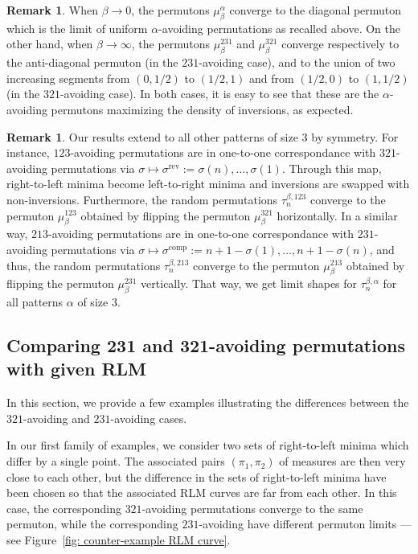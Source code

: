 \documentclass[a4paper,11pt]{amsart}
\theoremstyle{definition}
\newtheorem{rem}[thm]{Remark}
\begin{document}
\begin{rem}
When $\beta \to 0$, the permutons $\mu^{\alpha}_{\beta}$ converge to the diagonal permuton which is the limit of uniform $\alpha$-avoiding permutations as recalled above.
On the other hand, when $\beta \to \infty$, 
the permutons $\mu^{231}_{\beta}$ and $\mu^{321}_{\beta}$ converge respectively to the anti-diagonal permuton (in the $231$-avoiding case), 
and to the union of two increasing segments from $(0,1/2)$ to $(1/2,1)$ and from $(1/2,0)$ to $(1,1/2)$ (in the $321$-avoiding case). 
In both cases, it is easy to see that these are the $\alpha$-avoiding permutons maximizing the density of inversions, as expected.
\end{rem}

\begin{rem}
    Our results extend to all other patterns of size $3$ by symmetry.
    For instance, $123$-avoiding permutations are in one-to-one correspondance with $321$-avoiding permutations via $\sigma \mapsto \sigma^\mathrm{rev} := \sigma(n), \dots, \sigma(1)$.
    Through this map, right-to-left minima become left-to-right minima and inversions are swapped with non-inversions.
    Furthermore, the random permutations $\tau_n^{\beta,123}$ converge to the permuton $\mu_\beta^{123}$ obtained by flipping the permuton $\mu_\beta^{321}$ horizontally.
    In a similar way, $213$-avoiding permutations are in one-to-one correspondance with $231$-avoiding permutations via $\sigma \mapsto \sigma^\mathrm{comp} := n+1-\sigma(1), \dots, n+1-\sigma(n)$, and thus, the random permutations $\tau_n^{\beta,213}$ converge to the permuton $\mu_\beta^{213}$ obtained by flipping the permuton $\mu_\beta^{231}$ vertically.
    That way, we get limit shapes for $\tau_n^{\beta,\alpha}$ for all patterns $\alpha$ of size $3$.
\end{rem}


\subsection{Comparing 231 and 321-avoiding permutations with given RLM}
\label{sec:counterexamples}

In this section, we provide a few examples illustrating the differences between the $321$-avoiding and $231$-avoiding cases.

In our first family of examples, we consider two sets of right-to-left minima which differ by a single point. 
The associated pairs $\left( \pi_1, \pi_2 \right)$ of measures are then very close to each other, but the difference in the sets of right-to-left minima
have been chosen so that the associated RLM curves are far from each other.
In this case, the corresponding $321$-avoiding permutations converge to the same permuton, while the corresponding $231$-avoiding have different permuton limits 
--- see Figure~\ref{fig: counter-example RLM curve}.
\end{document}
